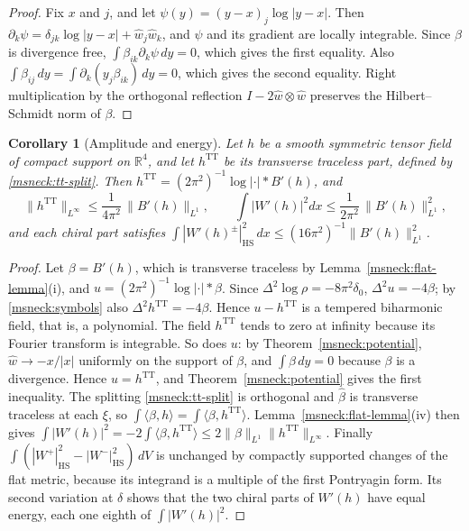 \documentclass[11pt]{article}
\numberwithin{equation}{section}
\newtheorem{corollary}[theorem]{Corollary}
\theoremstyle{definition}
\theoremstyle{remark}
\newcommand{\HS}{\mathrm{HS}}
\begin{document}
\begin{proof}
Fix \(x\) and \(j\), and let \(\psi(y)=(y-x)_j\log|y-x|\). Then
\(\partial_k\psi=\delta_{jk}\log|y-x|+\hat w_j\hat w_k\), and \(\psi\) and its
gradient are locally integrable. Since \(\beta\) is divergence free,
\(\int\beta_{ik}\partial_k\psi\,dy=0\), which gives the first equality.
Also \(\int\beta_{ij}\,dy=\int\partial_k(y_j\beta_{ik})\,dy=0\), which
gives the second equality. Right multiplication by the orthogonal
reflection \(I-2\hat w\otimes\hat w\) preserves the Hilbert--Schmidt
norm of \(\beta\).
\end{proof}

\begin{corollary}[Amplitude and energy]\label{msneck:amplitude}
Let \(h\) be a smooth symmetric tensor field of compact support on
\(\mathbb R^4\), and let \(h^{\mathrm{TT}}\) be its transverse traceless part,
defined by \eqref{msneck:tt-split}. Then
\(h^{\mathrm{TT}}=(2\pi^2)^{-1}\log|\cdot|*B'(h)\), and
\begin{equation}\label{msneck:amplitude-bounds}
 \|h^{\mathrm{TT}}\|_{L^\infty}\le\frac1{4\pi^2}\,\|B'(h)\|_{L^1},\qquad
 \int|W'(h)|^2dx\le\frac1{2\pi^2}\,\|B'(h)\|_{L^1}^2,
\end{equation}
and each chiral part satisfies
\(\int|W'(h)^\pm|_{\HS}^2\,dx\le(16\pi^2)^{-1}\|B'(h)\|_{L^1}^2\).
\end{corollary}

\begin{proof}
Let \(\beta=B'(h)\), which is transverse traceless by
Lemma~\ref{msneck:flat-lemma}(i), and \(u=(2\pi^2)^{-1}\log|\cdot|*\beta\). Since
\(\Delta^2\log\rho=-8\pi^2\delta_0\), \(\Delta^2u=-4\beta\); by
\eqref{msneck:symbols} also \(\Delta^2h^{\mathrm{TT}}=-4\beta\). Hence
\(u-h^{\mathrm{TT}}\) is a tempered biharmonic field, that is, a polynomial.
The field \(h^{\mathrm{TT}}\) tends to zero at infinity because its Fourier
transform is integrable. So does \(u\): by Theorem~\ref{msneck:potential},
\(\hat w\to-x/|x|\) uniformly on the support of \(\beta\), and
\(\int\beta\,dy=0\) because \(\beta\) is a divergence. Hence
\(u=h^{\mathrm{TT}}\), and Theorem~\ref{msneck:potential} gives the first
inequality. The splitting \eqref{msneck:tt-split} is orthogonal and
\(\hat\beta\) is transverse traceless at each \(\xi\), so
\(\int\langle\beta,h\rangle=\int\langle\beta,h^{\mathrm{TT}}\rangle\).
Lemma~\ref{msneck:flat-lemma}(iv) then gives
\(\int|W'(h)|^2=-2\int\langle\beta,h^{\mathrm{TT}}\rangle\le2\|\beta\|_{L^1}
\|h^{\mathrm{TT}}\|_{L^\infty}\). Finally
\(\int(|W^+|_{\HS}^2-|W^-|_{\HS}^2)\,dV\) is unchanged by compactly supported
changes of the flat metric, because its integrand is a multiple of the
first Pontryagin form. Its second variation at \(\delta\) shows that the
two chiral parts of \(W'(h)\) have equal energy, each one eighth of
\(\int|W'(h)|^2\).
\end{proof}
\end{document}
